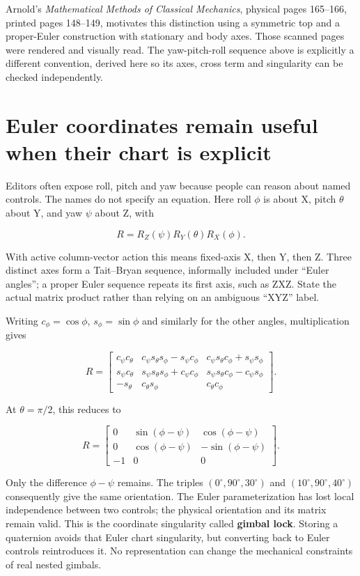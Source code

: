 Arnold's \emph{Mathematical Methods of Classical Mechanics}, physical pages 165--166, printed pages 148--149, motivates this distinction using a symmetric top and a proper-Euler construction with stationary and body axes. Those scanned pages were rendered and visually read. The yaw-pitch-roll sequence above is explicitly a different convention, derived here so its axes, cross term and singularity can be checked independently.

\section{Euler coordinates remain useful when their chart is explicit}\label{01-foundations-i-ch019-euler-coordinates-remain-useful-when-their-chart-is-explicit}

Editors often expose roll, pitch and yaw because people can reason about named controls. The names do not specify an equation. Here roll \(\phi\) is about X, pitch \(\theta\) about Y, and yaw \(\psi\) about Z, with

\[
R=R_Z(\psi)R_Y(\theta)R_X(\phi).
\]

With active column-vector action this means fixed-axis X, then Y, then Z. Three distinct axes form a Tait--Bryan sequence, informally included under ``Euler angles''; a proper Euler sequence repeats its first axis, such as ZXZ. State the actual matrix product rather than relying on an ambiguous ``XYZ'' label.

Writing \(c_\phi=\cos\phi\), \(s_\phi=\sin\phi\) and similarly for the other angles, multiplication gives

\[
R=\begin{bmatrix}
c_\psi c_\theta&c_\psi s_\theta s_\phi-s_\psi c_\phi&c_\psi s_\theta c_\phi+s_\psi s_\phi\\
s_\psi c_\theta&s_\psi s_\theta s_\phi+c_\psi c_\phi&s_\psi s_\theta c_\phi-c_\psi s_\phi\\
-s_\theta&c_\theta s_\phi&c_\theta c_\phi
\end{bmatrix}.
\]

At \(\theta=\pi/2\), this reduces to

\[
R=\begin{bmatrix}
0&\sin(\phi-\psi)&\cos(\phi-\psi)\\
0&\cos(\phi-\psi)&-\sin(\phi-\psi)\\
-1&0&0
\end{bmatrix}.
\]

Only the difference \(\phi-\psi\) remains. The triples \((0^\circ,90^\circ,30^\circ)\) and \((10^\circ,90^\circ,40^\circ)\) consequently give the same orientation. The Euler parameterization has lost local independence between two controls; the physical orientation and its matrix remain valid. This is the coordinate singularity called \textbf{gimbal lock}. Storing a quaternion avoids that Euler chart singularity, but converting back to Euler controls reintroduces it. No representation can change the mechanical constraints of real nested gimbals.

